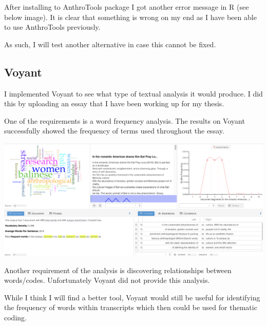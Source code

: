 \documentclass{article}
\begin{document}
After installing to AnthroTools package I got another error message in R (see below image). It is clear that something is wrong on my end as I have been able to use AnthroTools previously. 

As such, I will test another alternative in case this cannot be fixed. 

\subsection{Voyant}
I implemented Voyant to see what type of textual analysis it would produce. I did this by uploading an essay that I have been working up for my thesis.

One of the requirements is a word frequency analysis. The results on Voyant successfully showed the frequency of terms used throughout the essay.

\includegraphics[width=\textwidth]{Voyant.png}

Another requirement of the analysis is discovering relationships between words/codes. Unfortunately Voyant did not provide this analysis.

While I think I will find a better tool, Voyant would still be useful for identifying the frequency of words within transcripts which then could be used for thematic coding. 
\end{document}
